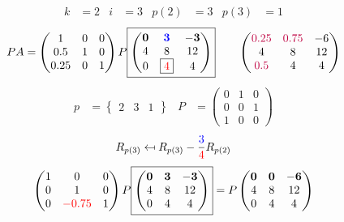 \documentclass[pdf]{beamer}
\begin{document}
\begin{frame}{}\begin{align*} k &= 2 & i &= 3 & p(2) &= 3 & p(3) &= 1\end{align*} $$PA=\begin{pmatrix}1&0&0\\0.5&1&0\\0.25&0&1\end{pmatrix} P \boxed{\begin{pmatrix}\mathbf{0}&\mathbf{{\color{blue}3}}&\mathbf{-3}\\4&8&12\\0&\boxed{{\color{red}4}}&4\end{pmatrix}} \quad\quad \begin{pmatrix}{\color{purple}0.25}&{\color{purple}0.75}&-6\\4&8&12\\{\color{purple}0.5}&4&4\end{pmatrix}$$ \begin{align*} p&= \begin{Bmatrix}2&3&1\end{Bmatrix} & P&= \begin{pmatrix}0&1&0\\0&0&1\\1&0&0\end{pmatrix} \end{align*} $$R_{p(3)} \mapsfrom R_{p(3)} - \frac{{\color{blue}3}}{{\color{red}4}} R_{p(2)}$$ $$ \begin{pmatrix}1&0&0\\0&1&0\\0&{\color{red}-0.75}&1\end{pmatrix} P \boxed{\begin{pmatrix}\mathbf{0}&\mathbf{3}&\mathbf{-3}\\4&8&12\\0&4&4\end{pmatrix}} = P \begin{pmatrix}\mathbf{0}&\mathbf{0}&\mathbf{-6}\\4&8&12\\0&4&4\end{pmatrix} $$\end{frame}
\end{document}

